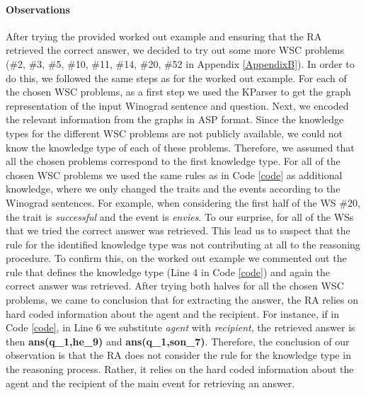 \paragraph{Observations}
After trying the provided worked out example and ensuring that the RA retrieved the correct answer, we decided to try out some more WSC problems (\#2, \#3, \#5, \#10, \#11, \#14, \#20, \#52 in Appendix \ref{AppendixB}).
In order to do this, we followed the same steps as for the worked out example. For each of the chosen WSC problems, as a first step we used the KParser to get the graph representation of the input Winograd sentence and question. Next, we encoded the relevant information from the graphs in ASP format. Since the knowledge types for the different WSC problems are not publicly available, we could not know the knowledge type of each of these problems. Therefore, we assumed that all the chosen problems correspond to the first knowledge type. For all of the chosen WSC problems we used the same rules as in Code \ref{code} as additional knowledge, where we only changed the traits and the events according to the Winograd sentences. For example, when considering the first half of the WS \#20, the trait is \textit{successful} and the event is \textit{envies}. To our surprise, for all of the WSs that we tried the correct answer was retrieved. This lead us to suspect that the rule for the identified knowledge type was not contributing at all to the reasoning procedure. 
To confirm this, on the worked out example we commented out the rule that defines the knowledge type (Line 4 in Code \ref{code}) and again the correct answer was retrieved. After trying both halves for all the chosen WSC problems, we came to conclusion that for extracting the answer, the RA relies on hard coded information about the agent and the recipient. For instance, if in Code \ref{code}, in Line 6 we substitute \textit{agent} with \textit{recipient}, the retrieved answer is then \textbf{ans(q\_1,he\_9)} and \textbf{ans(q\_1,son\_7)}.
Therefore, the conclusion of our observation is that the RA does not consider the rule for the knowledge type in the reasoning process. Rather, it relies on the hard coded information about the agent and the recipient of the main event for retrieving an answer. 

